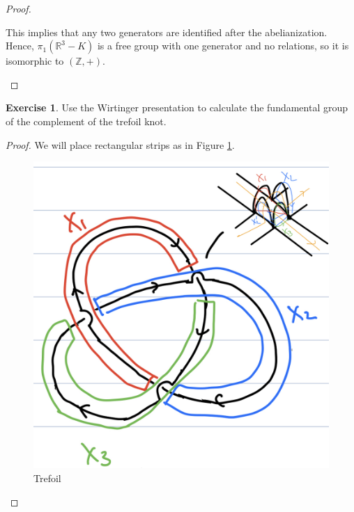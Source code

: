 \documentclass[12pt, psamsfonts]{amsart}
\theoremstyle{definition}
\newtheorem*{exer}{Exercise}
\theoremstyle{remark}
\numberwithin{equation}{section}
\begin{document}
\begin{proof}
\begin{itemize}
      This implies that any two generators are identified after the abelianization.
      Hence, $\pi_1(\mathbb{R}^3 - K)$ is a free group with one generator and no relations, so it is isomorphic to $(\mathbb{Z}, +)$.
  \end{itemize}
\end{proof}

\begin{exer}
  Use the Wirtinger presentation to calculate the fundamental group of the complement of the trefoil knot.
\end{exer}

\begin{proof}
  We will place rectangular strips as in Figure \ref{fig:trefoil}.
  \begin{figure}
    \includegraphics[width=\linewidth]{trefoil.jpeg}
    \caption{Trefoil}
    \label{fig:trefoil}
  \end{figure}


\end{proof}
\end{document}
